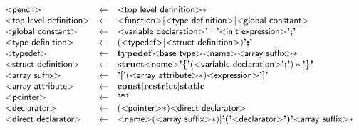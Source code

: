 \newcommand{\pgrammar}[1]{\text{\sf\textless#1\textgreater}}
\newcommand{\pkeyword}[1]{\mathbf{#1}}
\newcommand{\plexer}[1]{\text{\bf'#1'}}

\begin{figure}
\[
\begin{array}{lcl}
  \pgrammar{pencil} & \gets &  \pgrammar{top level definition}*\\
  \pgrammar{top level definition} & \gets & \pgrammar{function}
                                          | \pgrammar{type definition}
                                          | \pgrammar{global constant}\\

  \pgrammar{global constant} & \gets & \pgrammar{variable declaration}
                                       \plexer{=}
                                       \pgrammar{init expression} \plexer{;}\\

  \pgrammar{type definition} & \gets & (\pgrammar{typedef}
                                     | \pgrammar{struct definition}) \plexer{;}\\

  \pgrammar{typedef} & \gets & \pkeyword{typedef} \pgrammar{base type} \pgrammar{name} \pgrammar{array suffix}*\\

  \pgrammar{struct definition} & \gets & \pkeyword{struct} \pgrammar{name}
                                         \plexer{\{}
                                           (\pgrammar{variable declaration} \plexer{;})*
                                         \plexer{\}}\\

  \pgrammar{array suffix} & \gets & \plexer{[}
                                     (\pgrammar{array attribute}*) \pgrammar{expression}
                                    \plexer{]}\\

  \pgrammar{array attribute} & \gets & \pkeyword{const} | \pkeyword{restrict} | \pkeyword{static}\\

  \pgrammar{pointer} & \gets &  \plexer{*}\\

  \pgrammar{declarator} & \gets & (\pgrammar{pointer}*) \pgrammar{direct declarator}\\

  \pgrammar{direct declarator} & \gets & \pgrammar{name} (\pgrammar{array suffix}*)
                                       | \plexer{(} \pgrammar{declarator} \plexer{)} \pgrammar{array suffix}*\\


\end{array}\]
\end{figure}
